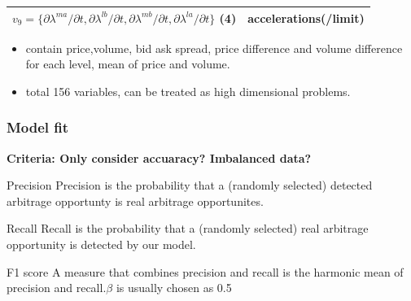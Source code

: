 \documentclass[xcolor={x11names,svgnames,dvipsnames}]{beamer}
\begin{document}
\begin{frame}
\begin{center}
{\begin{table}[H]
\begin{tabular}{|l|l| }
		   $v_9=\{\partial \lambda^{ma}/\partial t,  \partial \lambda^{lb}/\partial t,  \partial \lambda^{mb}/\partial t,  \partial \lambda^{la}/\partial t \}$  (4) & accelerations(/limit) \\
		   \hline		    
   		\end{tabular}
   		\end{table}
}
\end{center}
\begin{itemize}\footnotesize
			\item contain \alert{price,volume, bid ask spread, price difference and volume difference for each level, mean of price and volume.}  
            \item total 156 variables,  can be treated as high dimensional problems.
\end{itemize}
\end{frame}


\begin{frame}
\frametitle{Model fit}
\small \textbf{Criteria: Only consider accuaracy? Imbalanced data? }\\
\begin{block}{\scriptsize{Precision}}
\scriptsize{Precision is the probability that a (randomly selected) detected arbitrage opportunty is real arbitrage opportunites.}
\end{block}
\begin{block}{\scriptsize{Recall}}
\scriptsize{Recall is the probability that a (randomly selected) real arbitrage opportunity is detected by our model.}
\end{block}
\begin{block}{\scriptsize{F1 score}}
\scriptsize{A measure that combines precision and recall is the harmonic mean of precision and recall.$\beta$ is usually chosen as 0.5}
\end{block}

\end{frame}
\end{document}
